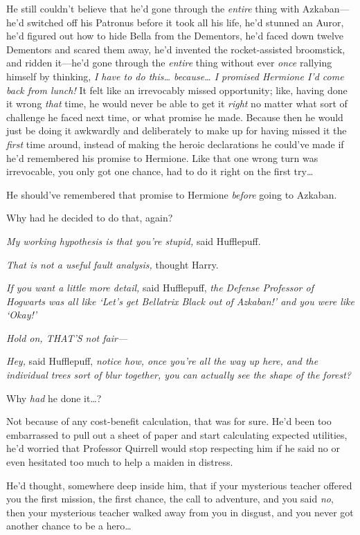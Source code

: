 He still couldn't believe that he'd gone through the \emph{entire} thing with 
Azkaban---he'd switched off his Patronus before it took all his life, he'd 
stunned an Auror, he'd figured out how to hide Bella from the Dementors, he'd 
faced down twelve Dementors and scared them away, he'd invented the 
rocket-assisted broomstick, and ridden it---he'd gone through the \emph{entire} 
thing without ever \emph{once} rallying himself by thinking, \emph{I have to do 
this{\ldots} because{\ldots} I promised Hermione I'd come back from lunch!} It 
felt like an irrevocably missed opportunity; like, having done it wrong 
\emph{that} time, he would never be able to get it \emph{right} no matter what 
sort of challenge he faced next time, or what promise he made. Because then he 
would just be doing it awkwardly and deliberately to make up for having missed 
it the \emph{first} time around, instead of making the heroic declarations he 
could've made if he'd remembered his promise to Hermione. Like that one wrong 
turn was irrevocable, you only got one chance, had to do it right on the first 
try{\ldots}

He should've remembered that promise to Hermione \emph{before} going to Azkaban.

Why had he decided to do that, again?

\emph{My working hypothesis is that you're stupid,} said Hufflepuff.

\emph{That is not a useful fault analysis,} thought Harry.

\emph{If you want a little more detail,} said Hufflepuff, \emph{the Defense 
Professor of Hogwarts was all like `Let's get Bellatrix Black out of Azkaban!' 
and you were like `Okay!'}

\emph{Hold on, THAT'S not fair---}

\emph{Hey,} said Hufflepuff, \emph{notice how, once you're all the way up here, 
and the individual trees sort of blur together, you can actually see the shape 
of the forest?}

Why \emph{had} he done it{\ldots}?

Not because of any cost-benefit calculation, that was for sure. He'd been too 
embarrassed to pull out a sheet of paper and start calculating expected 
utilities, he'd worried that Professor Quirrell would stop respecting him if he 
said no or even hesitated too much to help a maiden in distress.

He'd thought, somewhere deep inside him, that if your mysterious teacher 
offered you the first mission, the first chance, the call to adventure, and you 
said \emph{no}, then your mysterious teacher walked away from you in disgust, 
and you never got another chance to be a hero{\ldots}

